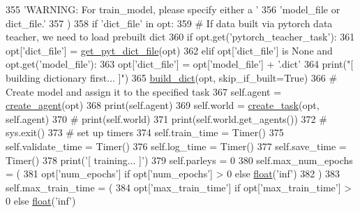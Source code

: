 \begin{DoxyCode}
355                 \textcolor{stringliteral}{'WARNING: For train\_model, please specify either a '}
356                 \textcolor{stringliteral}{'model\_file or dict\_file.'}
357             )
358         \textcolor{keywordflow}{if} \textcolor{stringliteral}{'dict\_file'} \textcolor{keywordflow}{in} opt:
359             \textcolor{comment}{# If data built via pytorch data teacher, we need to load prebuilt dict}
360             \textcolor{keywordflow}{if} opt.get(\textcolor{stringliteral}{'pytorch\_teacher\_task'}):
361                 opt[\textcolor{stringliteral}{'dict\_file'}] = \hyperlink{namespaceparlai_1_1scripts_1_1build__pytorch__data_a6ec85a5842150af78f5178d75075b0cc}{get\_pyt\_dict\_file}(opt)
362             \textcolor{keywordflow}{elif} opt[\textcolor{stringliteral}{'dict\_file'}] \textcolor{keywordflow}{is} \textcolor{keywordtype}{None} \textcolor{keywordflow}{and} opt.get(\textcolor{stringliteral}{'model\_file'}):
363                 opt[\textcolor{stringliteral}{'dict\_file'}] = opt[\textcolor{stringliteral}{'model\_file'}] + \textcolor{stringliteral}{'.dict'}
364             print(\textcolor{stringliteral}{"[ building dictionary first... ]"})
365             \hyperlink{namespacebuild__dict}{build\_dict}(opt, skip\_if\_built=\textcolor{keyword}{True})
366         \textcolor{comment}{# Create model and assign it to the specified task}
367         self.agent = \hyperlink{namespaceparlai_1_1core_1_1agents_a00d77a7e26fb89e8bd900f7b2a02982a}{create\_agent}(opt)
368         print(self.agent)
369         self.world = \hyperlink{namespaceparlai_1_1core_1_1worlds_a79969c7ba76d4b3c500f5bb776444dc6}{create\_task}(opt, self.agent)
370         \textcolor{comment}{# print(self.world)}
371         print(self.world.get\_agents())
372         \textcolor{comment}{# sys.exit()}
373         \textcolor{comment}{# set up timers}
374         self.train\_time = Timer()
375         self.validate\_time = Timer()
376         self.log\_time = Timer()
377         self.save\_time = Timer()
378         print(\textcolor{stringliteral}{'[ training... ]'})
379         self.parleys = 0
380         self.max\_num\_epochs = (
381             opt[\textcolor{stringliteral}{'num\_epochs'}] \textcolor{keywordflow}{if} opt[\textcolor{stringliteral}{'num\_epochs'}] > 0 \textcolor{keywordflow}{else} \hyperlink{namespaceprojects_1_1controllable__dialogue_1_1make__control__dataset_aa2b7207688c641dbc094ab44eca27113}{float}(\textcolor{stringliteral}{'inf'})
382         )
383         self.max\_train\_time = (
384             opt[\textcolor{stringliteral}{'max\_train\_time'}] \textcolor{keywordflow}{if} opt[\textcolor{stringliteral}{'max\_train\_time'}] > 0 \textcolor{keywordflow}{else} \hyperlink{namespaceprojects_1_1controllable__dialogue_1_1make__control__dataset_aa2b7207688c641dbc094ab44eca27113}{float}(\textcolor{stringliteral}{'inf'})

\end{DoxyCode}

